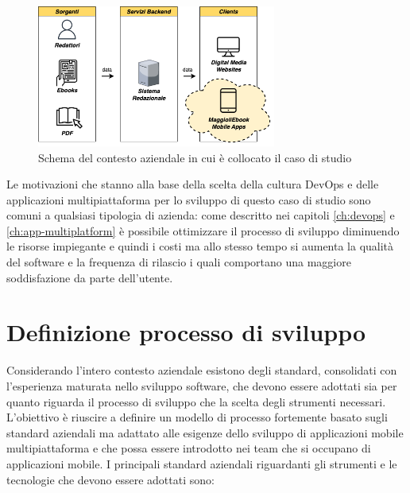 \begin{figure}[H]
    \centering
    \includegraphics[width=0.7\textwidth]{img/contesto-aziendale.png}
    \caption{Schema del contesto aziendale in cui è collocato il caso di studio}
    \label{contesto-aziendale-fig}
\end{figure}

Le motivazioni che stanno alla base della scelta della cultura DevOps e delle applicazioni multipiattaforma per lo sviluppo di questo caso di studio sono comuni a qualsiasi tipologia di azienda: come descritto nei capitoli \ref{ch:devops} e \ref{ch:app-multiplatform} è possibile ottimizzare il processo di sviluppo diminuendo le risorse impiegante e quindi i costi ma allo stesso tempo si aumenta la qualità del software e la frequenza di rilascio i quali comportano una maggiore soddisfazione da parte dell'utente.

\section{Definizione processo di sviluppo}
Considerando l'intero contesto aziendale esistono degli standard, consolidati con l'esperienza maturata nello sviluppo software, che devono essere adottati sia per quanto riguarda il processo di sviluppo che la scelta degli strumenti necessari. L'obiettivo è riuscire a definire un modello di processo fortemente basato sugli standard aziendali ma adattato alle esigenze dello sviluppo di applicazioni mobile multipiattaforma e che possa essere introdotto nei team che si occupano di applicazioni mobile. I principali standard aziendali riguardanti gli strumenti e le tecnologie che devono essere adottati sono:


